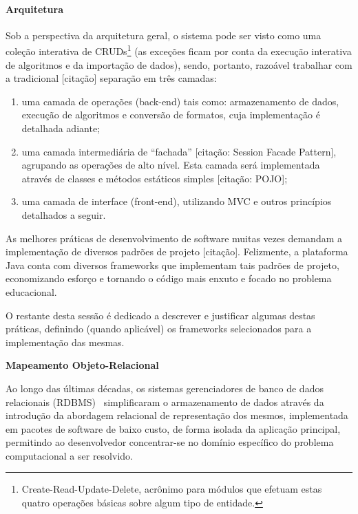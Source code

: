 \documentclass[12pt,twoside]{article}
\newcommand\liststyleLi{%
\renewcommand\labelitemi{[25CF?]}
\renewcommand\labelitemii{[25CB?]}
\renewcommand\labelitemiii{[25A0?]}
\renewcommand\labelitemiv{[25CF?]}
}
\begin{document}
\paragraph{Arquitetura}
{\upshape
Sob a perspectiva da arquitetura geral, o sistema pode ser visto como
uma cole\c{c}\~ao interativa de
CRUDs\footnote{Create{}-Read{}-Update{}-Delete, acr\^onimo para
m\'odulos que efetuam estas quatro opera\c{c}\~oes b\'asicas sobre
algum tipo de entidade.} (as exce\c{c}\~oes ficam por conta da
execu\c{c}\~ao interativa de algoritmos e da importa\c{c}\~ao de
dados), sendo, portanto, razo\'avel trabalhar com a tradicional
[cita\c{c}\~ao] separa\c{c}\~ao em tr\^es camadas:}

\liststyleLi
\begin{enumerate}
\item {\upshape
uma camada de opera\c{c}\~oes (back{}-end) tais como: armazenamento de
dados, execu\c{c}\~ao de algoritmos e convers\~ao de formatos, cuja
implementa\c{c}\~ao \'e detalhada adiante;}
\item {\upshape
uma camada intermedi\'aria de ``fachada'' [cita\c{c}\~ao: Session Facade
Pattern], agrupando as opera\c{c}\~oes de alto n\'ivel. Esta camada
ser\'a implementada atrav\'es de classes e m\'etodos est\'aticos
simples [cita\c{c}\~ao: POJO];}
\item {\upshape
uma camada de interface (front{}-end), utilizando MVC e outros
princ\'ipios detalhados a seguir.}
\end{enumerate}
As melhores pr\'aticas de desenvolvimento de software muitas vezes
demandam a implementa\c{c}\~ao de diversos padr\~oes de projeto
[cita\c{c}\~ao]. Felizmente, a plataforma Java conta com diversos
frameworks que implementam tais padr\~oes de projeto, economizando
esfor\c{c}o e tornando o c\'odigo mais enxuto e focado no problema
educacional.

O restante desta sess\~ao \'e dedicado a descrever e justificar algumas
destas pr\'aticas, definindo (quando aplic\'avel) os frameworks
selecionados para a implementa\c{c}\~ao das mesmas.

{\sffamily\bfseries
Mapeamento Objeto{}-Relacional}

Ao longo das \'ultimas d\'ecadas, os sistemas gerenciadores de banco de
dados relacionais (RDBMS) \ simplificaram o armazenamento de dados
atrav\'es da introdu\c{c}\~ao da abordagem relacional de
representa\c{c}\~ao dos mesmos, implementada em pacotes de software de
baixo custo, de forma isolada da aplica\c{c}\~ao principal, permitindo
ao desenvolvedor concentrar{}-se no dom\'inio espec\'ifico do problema
computacional a ser resolvido.
\end{document}
